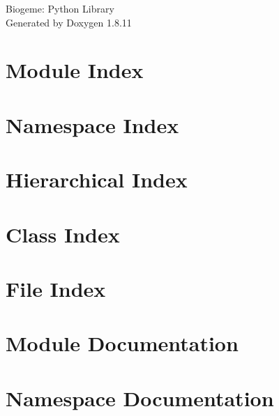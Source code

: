 \documentclass[twoside]{book}
\newcommand{\+}{\discretionary{\mbox{\scriptsize$\hookleftarrow$}}{}{}}
\newcommand{\clearemptydoublepage}{%
  \newpage{\pagestyle{empty}\cleardoublepage}%
}
\begin{document}
\hypersetup{pageanchor=false,
             bookmarksnumbered=true,
             pdfencoding=unicode
            }
\begin{titlepage}
\vspace*{7cm}
\begin{center}%
{\Large Biogeme\+: Python Library }\\
\vspace*{1cm}
{\large Generated by Doxygen 1.8.11}\\
\end{center}
\end{titlepage}
\clearemptydoublepage
\tableofcontents
\clearemptydoublepage
{}
\hypersetup{pageanchor=true}

\chapter{Module Index}

\chapter{Namespace Index}

\chapter{Hierarchical Index}

\chapter{Class Index}

\chapter{File Index}

\chapter{Module Documentation}





\chapter{Namespace Documentation}

\end{document}
